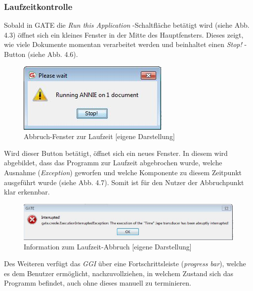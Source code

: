 \documentclass[12pt]{report}
\begin{document}
\subsubsection{Laufzeitkontrolle}
Sobald in GATE die \textit{\glqq Run this Application \grqq} -Schaltfläche betätigt wird (siehe Abb. 4.3) öffnet sich ein kleines Fenster in der Mitte des Hauptfensters. Dieses zeigt, wie viele Dokumente momentan verarbeitet werden und beinhaltet einen \textit{\glqq Stop!\grqq} -Button (siehe Abb. 4.6).

\begin{figure}[h!]
\begin{center}
\includegraphics[scale=0.8]{GATE_Bilder/Laufzeit.jpg}
\caption{Abbruch-Fenster zur Laufzeit [eigene Darstellung]}
\end{center}
\end{figure} 

Wird dieser Button betätigt, öffnet sich ein neues Fenster. In diesem wird abgebildet, dass das Programm zur Laufzeit abgebrochen wurde, welche Ausnahme (\textit{Exception}) geworfen und welche Komponente zu diesem Zeitpunkt ausgeführt wurde (siehe Abb. 4.7). Somit ist für den Nutzer der Abbruchpunkt klar erkennbar. \\

\begin{figure}[h!]
\begin{center}
\includegraphics[scale=0.8]{GATE_Bilder/Exception.jpg}
\caption{Information zum Laufzeit-Abbruch [eigene Darstellung]}
\end{center}
\end{figure} 

Des Weiteren verfügt das \textit{GGI} über eine Fortschrittsleiste (\textit{progress bar}), welche es dem Benutzer ermöglicht, nachzuvollziehen, in welchem Zustand sich das Programm befindet, auch ohne dieses manuell zu terminieren.
\end{document}
